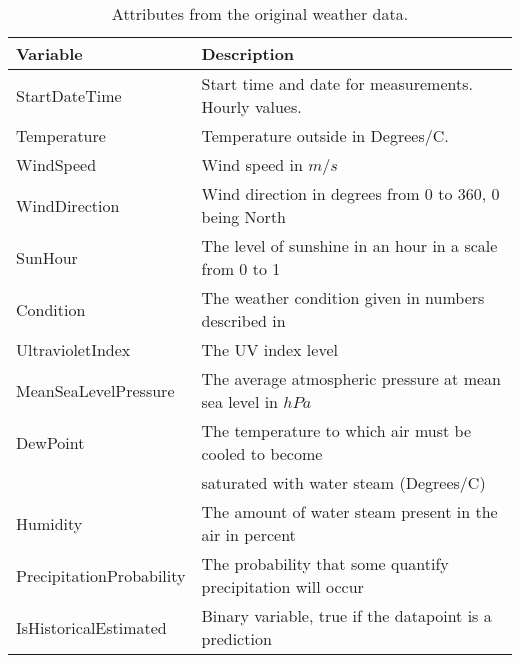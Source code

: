\begin{table}[H]
    \centering
    \begin{tabular}{ll}
     \hline
     \textbf{Variable} & \textbf{Description} \\
    \hline
    \hline
    StartDateTime  &  Start time and date for measurements. Hourly values.\\
    Temperature  &  Temperature outside in Degrees/C. \\
    WindSpeed  & Wind speed in $m/s$\\
    WindDirection  & Wind direction in degrees from 0 to 360, 0 being North \\
    SunHour  & The level of sunshine in an hour in a scale from 0 to 1 \\
    Condition  & The weather condition given in numbers described in \cite{condition} \\
    UltravioletIndex  & The UV index level \\
    MeanSeaLevelPressure  & The average atmospheric pressure at mean sea level in $hPa$ \\
    DewPoint  &  The temperature to which air must be cooled to become \\ & saturated with water steam (Degrees/C)\\
    Humidity  & The amount of water steam present in the air in percent\\
    PrecipitationProbability & The probability that some quantify precipitation will occur\\
    IsHistoricalEstimated & Binary variable, true if the datapoint is a prediction \\
    \hline
    \end{tabular}
    \caption{Attributes from the original weather data.}
    \label{tab: weatherdata}
\end{table}
